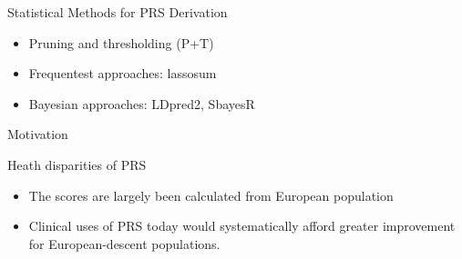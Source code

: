 \documentclass{beamer}
\begin{document}
\begin{frame}{Statistical Methods for PRS Derivation}
\begin{itemize}
    \item Pruning and thresholding (P+T)
    \item Frequentest approaches: lassosum
    \item Bayesian approaches: LDpred2, SbayesR
\end{itemize}


\end{frame}

\begin{frame}{Motivation}

\begin{figure}[h]	\noindent{}
    \label{fig:Disparities}
\end{figure}

        Heath disparities of PRS
        \begin{itemize}
            \item The scores are largely been calculated from European population
            \item Clinical uses of PRS today would systematically afford greater improvement for European-descent populations.
        \end{itemize}



\end{frame}
\end{document}
